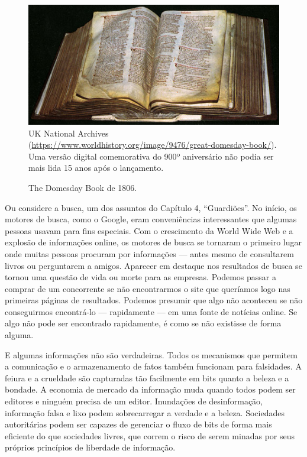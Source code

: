 \begin{figure}[h]
\centering
\caption{The Domesday Book de 1806.}
\label{fig:domesday}
\vspace{-0.3cm}
\includegraphics[scale=0.5]{imagens/domesday.jpg}
\\
\scriptsize{UK National Archives
(\url{https://www.worldhistory.org/image/9476/great-domesday-book/}). Uma versão
digital comemorativa do 900º aniversário não podia ser mais lida 15 anos após
o lançamento.}
\end{figure}

Ou considere a busca, um dos assuntos do Capítulo 4, ``Guardiões''. No início,
os motores de busca, como o Google, eram conveniências interessantes que algumas
pessoas usavam para fins especiais. Com o crescimento da World Wide Web e a 
explosão de informações online, os motores de busca se tornaram o primeiro lugar
onde muitas pessoas procuram por informações --- antes mesmo de consultarem
livros ou perguntarem a amigos. Aparecer em destaque nos resultados de busca se
tornou uma questão de vida ou morte para as empresas. Podemos passar a comprar 
de um concorrente se não encontrarmos o site que queríamos logo nas primeiras 
páginas de resultados. Podemos presumir que algo não aconteceu se não 
conseguirmos encontrá-lo --- rapidamente --- em uma fonte de notícias online.
Se algo não pode ser encontrado rapidamente, é como se não existisse de forma
alguma.

E algumas informações não são verdadeiras. Todos os mecanismos que permitem a
comunicação e o armazenamento de fatos também funcionam para falsidades. A 
feiura e a crueldade são capturadas tão facilmente em bits quanto a beleza e a 
bondade. A economia de mercado da informação muda quando todos podem ser 
editores e ninguém precisa de um editor. Inundações de desinformação, informação
falsa e lixo podem sobrecarregar a verdade e a beleza.
Sociedades autoritárias podem ser capazes de gerenciar o fluxo de bits de forma
mais eficiente do que sociedades livres, que correm o risco de serem minadas por
seus próprios princípios de liberdade de informação.

